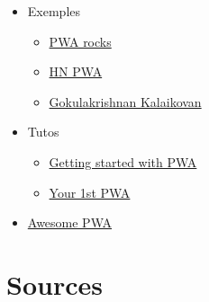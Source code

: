 \begin{itemize}
\tightlist
\item
  Exemples

  \begin{itemize}
  \tightlist
  \item
    \href{https://pwa.rocks/}{PWA rocks}
  \item
    \href{https://hnpwa.com/}{HN PWA}
  \item
    \href{https://github.com/gokulkrishh}{Gokulakrishnan Kalaikovan}
  \end{itemize}
\item
  Tutos

  \begin{itemize}
  \tightlist
  \item
    \href{https://addyosmani.com/blog/getting-started-with-progressive-web-apps/}{Getting
    started with PWA}
  \item
    \href{https://developers.google.com/web/fundamentals/codelabs/your-first-pwapp/}{Your
    1st PWA}
  \end{itemize}
\item
  \href{https://github.com/hemanth/awesome-pwa}{Awesome PWA}
\end{itemize}

\hypertarget{sources}{%
\section{Sources}\label{sources}}
